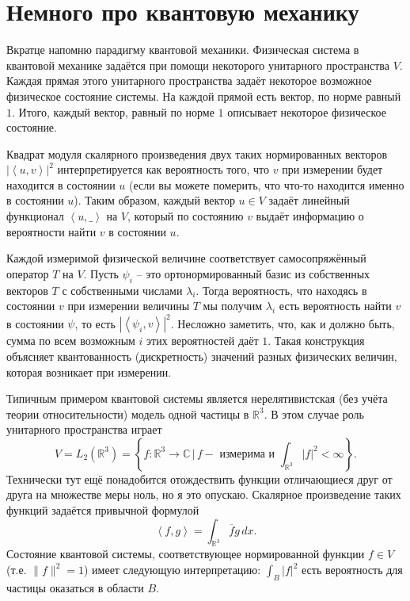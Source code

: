 \documentclass[10pt,a4paper,oneside]{book}
\theoremstyle{definition}
\newcommand{\mb}[1]{\mathbb{#1}}
\newcommand{\ovl}{\overline}
\def\lan{\left\langle }
\def\ran{\right\rangle}
\begin{document}
\section{Немного про квантовую механику}

Вкратце напомню парадигму квантовой механики. Физическая система в квантовой механике задаётся при помощи некоторого унитарного пространства $V$. Каждая прямая этого унитарного пространства задаёт некоторое возможное физическое состояние системы. На каждой прямой есть вектор, по норме равный $1$. Итого, каждый вектор, равный по норме $1$ описывает некоторое физическое состояние. 

Квадрат модуля скалярного произведения двух таких нормированных векторов  $|\lan u,v \ran|^2$ интерпретируется как вероятность того, что  $v$ при измерении будет находится в состоянии $u$ (если вы можете померить, что что-то находится именно в состоянии $u$). Таким образом, каждый вектор $u\in V$ задаёт линейный функционал $\lan u, \_ \ran $ на $V$, который по состоянию $v$ выдаёт информацию о вероятности найти $v$ в состоянии $u$.

Каждой измеримой физической величине соответствует самосопряжённый оператор $T$ на $V$. Пусть $\psi_i$ -- это ортонормированный базис из собственных векторов $T$ с собственными числами $\lambda_i$. Тогда вероятность, что находясь в состоянии $v$ при измерении величины $T$ мы получим $\lambda_i$ есть вероятность найти $v$ в состоянии $\psi$, то есть $|\lan \psi_i, v \ran|^2$. Несложно заметить, что, как и должно быть, сумма по всем возможным $i$ этих вероятностей даёт $1$. Такая конструкция объясняет квантованность (дискретность) значений разных физических величин, которая возникает при измерении.

Типичным примером квантовой системы является нерелятивистская (без учёта теории относительности) модель одной частицы в $\mb R^3$. В этом случае роль унитарного пространства играет 
$$V= L_2(\mb R^3)=\left\{  f\colon \mb R^3 \to \mb C\, \Big| \, f - \text{ измерима и } \int_{\mb R^3} |f|^2<\infty \right\}.$$
Технически тут ещё понадобится отождествить функции отличающиеся друг от друга на множестве меры ноль, но я это опускаю. Скалярное произведение таких функций задаётся привычной формулой 
$$\lan f,g \ran = \int_{\mb R^3} \ovl{f}g\, dx.$$
Состояние квантовой системы, соответствующее нормированной функции $f\in V$ (т.е. $\|f\|^2=1$)  имеет следующую интерпретацию: $\int_{B} |f|^2$ есть вероятность для частицы оказаться в области $B$. 

 
\end{document}
